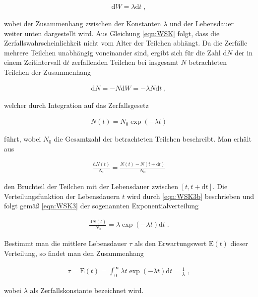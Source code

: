 \begin{align}
\textrm{d}W = \lambda \textrm{d}t \;, \label{eqn:WSK}
\end{align}

wobei der Zusammenhang zwischen der Konstanten $\lambda$ und der Lebensdauer weiter unten dargestellt wird. Aus Gleichung \eqref{eqn:WSK} folgt, dass die Zerfallswahrscheinlichkeit nicht vom Alter der Teilchen abhängt. Da die Zerfälle mehrere Teilchen unabhängig voneinander sind, ergibt sich für die Zahl $\textrm{d}N$ der in einem Zeitintervall $\textrm{d}t$ zerfallenden Teilchen bei insgesamt $N$ betrachteten Teilchen der Zusammenhang

\begin{align}
\textrm{d}N = - N\textrm{d}W = - \lambda N \textrm{d}t \;, \label{eqn:WSK2}
\end{align}

welcher durch Integration auf das Zerfallsgesetz

\begin{align}
N(t) = N_0 \exp(-\lambda t) \label{eqn:WSK3}
\end{align}

führt, wobei $N_0$ die Gesamtzahl der betrachteten Teilchen beschreibt. Man erhält aus 

\begin{align}
\frac{\textrm{d} N\left(t\right)}{N_0} = \frac{N(t) - N\left(t+\textrm{d}t\right)}{N_0} \label{eqn:WSK3b}
\end{align}

den Bruchteil der Teilchen mit der Lebensdauer zwischen $[t, t + \textrm{d}t]$. Die Verteilungsfunktion der Lebensdauern $t$ wird durch \eqref{eqn:WSK3b} beschrieben und folgt gemäß \eqref{eqn:WSK3} der sogenannten Exponentialverteilung

\begin{align}
\frac{\textrm{d}N(t)}{N_0} = \lambda\exp(-\lambda t) \textrm{d}t \label{eqn:WSK4} \;.
\end{align}

Bestimmt man die mittlere Lebensdauer $\tau$ als den Erwartungswert $\textrm{E}(t)$ dieser Verteilung, so findet man den Zusammenhang

\begin{align}
\tau = \textrm{E}(t) = \int_0^{\infty} \lambda t \exp (-\lambda t) \textrm{d}t = \frac{1}{\lambda}\;,
\end{align}

wobei $\lambda$ als Zerfallskonstante bezeichnet wird. 

